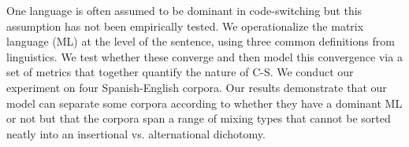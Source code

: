One language is often assumed to be dominant in code-switching but this assumption has not been empirically tested. We operationalize the matrix language (ML) at the level of the sentence, using three common definitions from linguistics. We test whether these converge and then model this convergence via a set of metrics that together quantify the nature of C-S. We conduct our experiment on four Spanish-English corpora. Our results demonstrate that our model can separate some corpora according to whether they have a dominant ML or not but that the corpora span a range of mixing types that cannot be sorted neatly into an insertional vs. alternational dichotomy.
